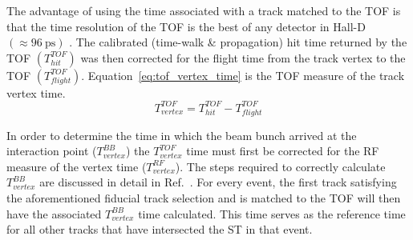 The advantage of using the time associated with a track matched to the TOF is that the time resolution of the TOF is the best of any detector in Hall-D $(\approx 96\ \mathrm{ps})$ \cite{zihlmann_tof}. The calibrated (time-walk \& propagation) hit time returned by the TOF $(T^{TOF}_{hit})$ was then corrected for the flight time from the track vertex to the TOF $(T^{TOF}_{flight})$.  Equation~\ref{eq:tof_vertex_time} is the TOF measure of the track vertex time.
	\begin{equation} \label{eq:tof_vertex_time}
		T^{TOF}_{vertex} = T^{TOF}_{hit} - T^{TOF}_{flight}
	\end{equation}

In order to determine the time in which the beam bunch arrived at the interaction point ($T^{BB}_{vertex}$) the $T^{TOF}_{vertex}$ time must first be corrected for the RF measure of the vertex time ($T^{RF}_{vertex}$).  The steps required to correctly calculate $T^{BB}_{vertex}$ are discussed in detail in Ref.~\cite{pooser16}.  For every event, the first track satisfying the aforementioned fiducial track selection and is matched to the TOF will then have the associated $T^{BB}_{vertex}$ time calculated.  This time serves as the reference time for all other tracks that have intersected the ST in that event.



